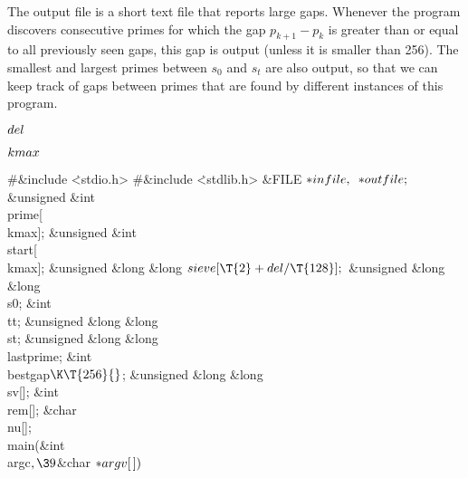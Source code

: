 The output file is a short text file that reports large gaps.
Whenever the program discovers consecutive primes for which the gap
$p_{k+1}-p_k$ is greater than or equal to all previously seen gaps,
this gap is output (unless it is smaller than 256).
The smallest and largest
primes between $s_0$ and $s_t$ are also output, so that we can keep
track of gaps between primes that are
found by different instances of this program.

\Y\B\4\D$\\{del}$ \5
\par
\B\4\D$\\{kmax}$ \5
\par
\Y\B\8\#\&{include} \.{<stdio.h>}\6
\8\#\&{include} \.{<stdlib.h>}\6
\&{FILE} ${}{*}\\{infile},{}$ ${}{*}\\{outfile};{}$\6
\&{unsigned} \&{int} \\{prime}[\\{kmax}];\6
\&{unsigned} \&{int} \\{start}[\\{kmax}];\6
\&{unsigned} \&{long} \&{long} ${}\\{sieve}[\T{2}+\\{del}/\T{128}];{}$\6
\&{unsigned} \&{long} \&{long} \\{s0};\6
\&{int} \\{tt};\6
\&{unsigned} \&{long} \&{long} \\{st};\6
\&{unsigned} \&{long} \&{long} \\{lastprime};%
\6
\&{int} \\{bestgap}${}\K\T{256}{}$;\6
\&{unsigned} \&{long} \&{long} \\{sv}[];\6
\&{int} \\{rem}[];\6
\&{char} \\{nu}[];\7
\\{main}(\&{int} \\{argc}${},\39{}$\&{char} ${}{*}\\{argv}[\,]){}$\1\1\2\2\6
